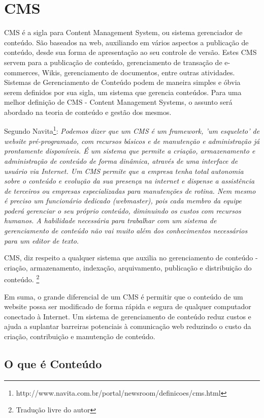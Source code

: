 \chapter{CMS}


CMS é a sigla para Content Management System, ou sistema gerenciador de conteúdo. São baseados na web, auxiliando em vários aspectos a publicação de conteúdo, desde sua forma de apresentação ao seu controle de versão. Estes CMS servem para a publicação de conteúdo, gerenciamento de transação de e-commerces, Wikis, gerenciamento de documentos, entre outras atividades. Sistemas de Gerenciamento de Conteúdo podem de maneira simples e óbvia serem definidos por sua sigla, um sistema que gerencia conteúdos.\cite{cms_wikipedia} Para uma melhor definição de CMS - Content Management Systems, o assunto será abordado na teoria de conteúdo e gestão dos mesmos. 

Segundo Navita\cite{navita}\footnote{http://www.navita.com.br/portal/newsroom/definicoes/cms.html}: \emph{Podemos dizer que um CMS é um framework, 'um esqueleto' de website pré-programado, com recursos básicos e de manutenção e administração já prontamente disponíveis. É um sistema que permite a criação, armazenamento e administração de conteúdo de forma dinâmica, através de uma interface de usuário via Internet. Um CMS permite que a empresa tenha total autonomia sobre o conteúdo e evolução da sua presença na internet e dispense a assistência de terceiros ou empresas especializadas para manutenções de rotina. Nem mesmo é preciso um funcionário dedicado (webmaster), pois cada membro da equipe poderá gerenciar o seu próprio conteúdo, diminuindo os custos com recursos humanos. A habilidade necessária para trabalhar com um sistema de gerenciamento de conteúdo não vai muito além dos conhecimentos necessários para um editor de texto.} 

CMS, diz respeito a qualquer sistema que auxilia no gerenciamento de conteúdo - criação, armazenamento, indexação, arquivamento, publicação e distribuição do conteúdo.
\cite{what_is_cms}\footnote{Tradução livre do autor}

Em suma, o grande diferencial de um CMS é permitir que o conteúdo de um website possa ser modificado de forma rápida e segura de qualquer computador conectado à Internet. Um sistema de gerenciamento de conteúdo reduz custos e ajuda a suplantar barreiras potenciais à comunicação web reduzindo o custo da criação, contribuição e manutenção de conteúdo.
\cite{navita}

\section{O que é Conteúdo}

